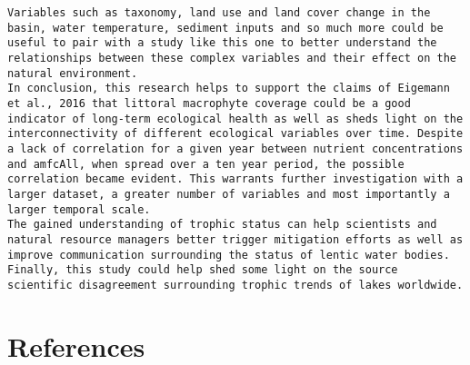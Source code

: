 \documentclass[
]{book}
\begin{document}
\begin{verbatim}
Variables such as taxonomy, land use and land cover change in the basin, water temperature, sediment inputs and so much more could be useful to pair with a study like this one to better understand the relationships between these complex variables and their effect on the natural environment. 
In conclusion, this research helps to support the claims of Eigemann et al., 2016 that littoral macrophyte coverage could be a good indicator of long-term ecological health as well as sheds light on the interconnectivity of different ecological variables over time. Despite a lack of correlation for a given year between nutrient concentrations and amfcAll, when spread over a ten year period, the possible correlation became evident. This warrants further investigation with a larger dataset, a greater number of variables and most importantly a larger temporal scale. 
The gained understanding of trophic status can help scientists and natural resource managers better trigger mitigation efforts as well as improve communication surrounding the status of lentic water bodies. Finally, this study could help shed some light on the source scientific disagreement surrounding trophic trends of lakes worldwide.  
\end{verbatim}

\hypertarget{references}{%
\chapter*{References}\label{references}}

  
\end{document}
